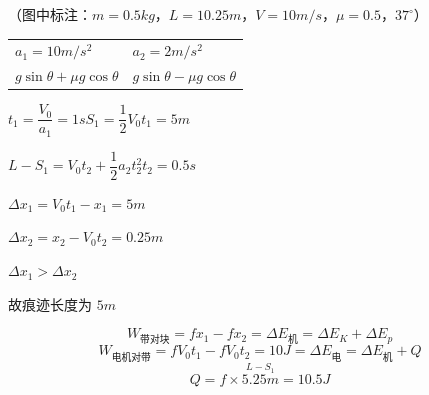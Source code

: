 \begin{problem}
（图中标注：$m=0.5\unit{kg}$，$L=10.25\unit{m}$，$V=10\unit{m/s}$，$\mu=0.5$，$37^\circ$）
\begin{solution}
\begin{tabular}{@{}ll@{}}
$a_1=10\unit{m/s^2}$ & $a_2=2\unit{m/s^2}$\\
$g\sin\theta+\mu g\cos\theta$ & $g\sin\theta-\mu g\cos\theta$
\end{tabular}

$t_1=\dfrac{V_0}{a_1}=1\unit{s}$\qquad $S_1=\dfrac12V_0t_1=5\unit{m}$

$L-S_1=V_0t_2+\dfrac12a_2t_2^2$\qquad $t_2=0.5\unit{s}$

$\Delta x_1=V_0t_1-x_1=5\unit{m}$ %

$\Delta x_2=x_2-V_0t_2=0.25\unit{m}$

$\Delta x_1>\Delta x_2$

故痕迹长度为 $5\unit{m}$

\[ W_{\text{带对块}}=fx_1-fx_2=\Delta E_{\text{机}}=\Delta E_K+\Delta E_p \]
\[ W_{\text{电机对带}}=fV_0t_1-fV_0t_2=10\unit{J}=\Delta E_{\text{电}}=\Delta E_{\text{机}}+Q \]
\[ Q=f\times\overset{L-S_1}{5.25\unit{m}}=10.5\unit{J} \]
\end{solution}
\end{problem}
